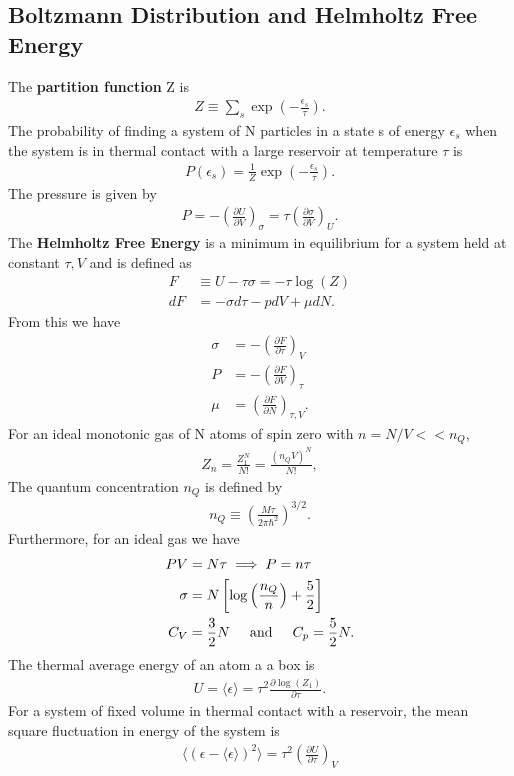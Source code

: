 \begin{multicols}{2}
	\section{Boltzmann Distribution and Helmholtz Free Energy}
	The \textbf{partition function} Z is
	\begin{align}
		Z \equiv \sum_{s} \exp\left(-\frac{\epsilon_s}{\tau}\right).
	\end{align}
	The probability of finding a system of N particles in a state s of energy $\epsilon_s$ when the system is in thermal contact with a large reservoir at temperature $\tau$ is
	\begin{align}
		P(\epsilon_s) = \frac{1}{Z}\exp\left(-\frac{\epsilon_s}{\tau}\right).
	\end{align} 
	The pressure is given by
	\begin{align}
		P = -\left(\frac{\partial U}{\partial V}\right)_\sigma = \tau\left(\frac{\partial \sigma}{\partial V}\right)_U.
	\end{align}
	The \textbf{Helmholtz Free Energy} is a minimum in equilibrium for a system held at constant $\tau, V$ and is defined as
	\begin{align}
		F&\equiv U-\tau \sigma = -\tau\log(Z) \\
		dF&=-\sigma d\tau-pdV+\mu dN.	
	\end{align}
	From this we have
	\begin{align}
		\sigma &= -\left(\frac{\partial F}{\partial \tau}\right)_V \\
		P &= -\left(\frac{\partial F}{\partial V}\right)_\tau \\
		\mu &= \left(\frac{\partial F}{\partial N}\right)_{\tau,V}.
	\end{align}
	For an ideal monotonic gas of N atoms of spin zero with $n=N/V << n_Q$,
	\begin{align}
		Z_n = \frac{Z_1^N}{N!}=\frac{(n_Q V)^N}{N!},
	\end{align}
	The quantum concentration $n_Q$ is defined by
	\begin{align}
		n_Q \equiv \left(\frac{M\tau}{2\pi\hbar^2}\right)^{3/2}.
	\end{align}
	Furthermore, for an ideal gas we have
	\begin{align}
		PV&=N\tau \implies P = n\tau\\
		\sigma &=N\left[\log\left(\frac{n_Q}{n}\right)+\frac{5}{2}\right] \\
		C_V&=\frac{3}{2}N \hspace{0.5cm}\textrm{and}\hspace{0.5cm}C_p=\frac{5}{2}N.  
	\end{align}
	The thermal average energy of an atom a a box is
	\begin{align}
		U = \langle \epsilon \rangle = \tau^2 \frac{\partial \log (Z_1)}{\partial \tau}.
	\end{align}
	For a system of fixed volume in thermal contact with a reservoir, the mean square fluctuation in energy of the system is
	\begin{align}
		\langle(\epsilon - 	\langle\epsilon \rangle)^2 \rangle = \tau^2\left(\frac{\partial U}{\partial \tau}\right)_V
	\end{align}  

\end{multicols}
